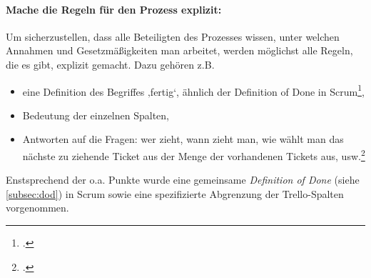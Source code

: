 \paragraph{Mache die Regeln für den Prozess explizit:}Um sicherzustellen, dass alle Beteiligten des Prozesses wissen, unter welchen Annahmen und Gesetzmäßigkeiten man arbeitet, werden möglichst alle Regeln, die es gibt, explizit gemacht. Dazu gehören z.B.
\begin{itemize}
\item eine Definition des Begriffes ‚fertig‘, ähnlich der Definition of Done in Scrum\footcite{wikiScrum},
\item Bedeutung der einzelnen Spalten,
\item Antworten auf die Fragen: wer zieht, wann zieht man, wie wählt man das nächste zu ziehende Ticket aus der Menge der vorhandenen Tickets aus, usw.\footcite{wikiKanban}
\end{itemize}

Enstsprechend der o.a. Punkte wurde eine gemeinsame \emph{Definition of Done} (siehe \ref{subsec:dod}) in Scrum sowie eine spezifizierte Abgrenzung der Trello-Spalten vorgenommen.

